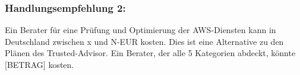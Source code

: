 \subsubsection*{Handlungsempfehlung 2:} 
Ein Berater für eine Prüfung und Optimierung der AWS-Diensten kann in Deutschland zwischen x und N-EUR kosten. Dies ist eine Alternative zu den Plänen des Trusted-Advisor. Ein Berater, der alle 5 Kategorien abdeckt, könnte [BETRAG] kosten. %
\\\\
\begin{comment}
  \subsection*{Umweltbezogene Aspekte}
  \addcontentsline{toc}{subsection}{Umweltbezogene Aspekte} %
  [WORK IN PROGRESS]\\
  In dieser Arbeit geht es um die Überwachung und Optimierung von Cloud-Diensten unter finanziellen Aspekten. 
  
  Serverfarmen und ihre Speichereinheiten  haben Auswirkungen auf die Umwelt, da sie eine große Menge an Strom benötigen. 
  [t.ly/XYMJ]
  \\
  \subsection*{Test von den Werkzeugen und Maßnahmen}
  \addcontentsline{toc}{subsection}{Test von den Werkzeugen und Maßnahmen} %
  Da es in dieser Arbeit zeitlich nicht gelungen ist, die Überwachungswerkzeuge und Optimierungsmaßnahmen umzusetzen, bleibt es noch sie in einer echten Umgebung zu testen. Es wäre möglich zu verifizieren, ob die hier genannten Maßnahmen zur vergleichbaren Einsparungen führen, wie die vom Cloud-Anbieter Amazon genannten.
  
  Amazon bietet ein kostenloses Kontingent an, die jedoch für diese Tests nicht genug war. 
  \\
  \end{comment}
  
\begin{comment}
Von Buch "Gestaltung"
  Schluss (Fazit)
Den Abschluss der Arbeit bildet die Zusammenfassung der wesentlichen
Ergebnisse, die folgende drei Punkte beinhaltet:
Beantwortung der Forschungsfrage, die Sie in der Einleitung
aufgeworfen haben.
Sinnstiftung der Arbeit: Für welchen Zweck sollen die Ergebnisse
verwendet werden?
Gegebenenfalls auch persönliche Bemerkungen und Bewertungen oder
ein kurzer Ausblick.
\end{tcolorbox}

\end{comment}


